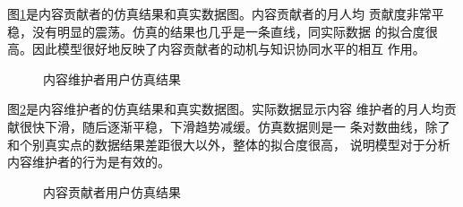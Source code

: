 图\ref{fig:simu3}是内容贡献者的仿真结果和真实数据图。内容贡献者的月人均
贡献度非常平稳，没有明显的震荡。仿真的结果也几乎是一条直线，同实际数据
的拟合度很高。因此模型很好地反映了内容贡献者的动机与知识协同水平的相互
作用。

\begin{figure}[!htb]
  \centering
  \caption{\small{内容维护者用户仿真结果}}
  \label{fig:simu3}
\end{figure}

图\ref{fig:simu4}是内容维护者的仿真结果和真实数据图。实际数据显示内容
维护者的月人均贡献很快下滑，随后逐渐平稳，下滑趋势减缓。仿真数据则是一
条对数曲线，除了和个别真实点的数据结果差距很大以外，整体的拟合度很高，
说明模型对于分析内容维护者的行为是有效的。
\begin{figure}[!htb]
  \centering
  \caption{\small{内容贡献者用户仿真结果}}
  \label{fig:simu4}
\end{figure}


